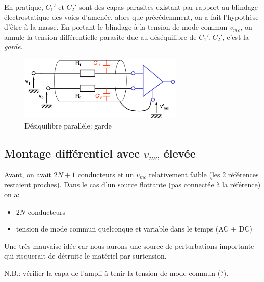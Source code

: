 En pratique, \(C_1'\text{ et }C_2'\) sont des capas parasites existant par rapport au blindage électrostatique des voies d'amenée, alors que précédemment, on a fait l'hypothèse d'être à la masse. En portant le blindage à la tension de mode commun \(v_{mc}\), on annule la tension différentielle parasite due au déséquilibre de \(C_1', C_2'\), c'est la \emph{garde}.
\begin{figure}[H] 
	\centering 
	\includegraphics[width=0.7\textwidth,height=10\baselineskip,keepaspectratio]{ch3/image20} 
	\caption{Désiquilibre parallèle: garde} 
\end{figure}
\subsection{Montage différentiel avec \texorpdfstring{\(v_{mc}\)}{tension de mode commun} élevée}\label{subsec:montdiffvmcgrand}
Avant, on avait \(2N+1\) conducteurs et un \(v_{mc}\) relativement faible (les 2 références restaient proches). Dans le cas d'un source flottante (pas connectée à la référence) on a:
\begin{itemize}
	\item \(2N\) conducteurs
	\item tension de mode commun quelconque et variable dans le temps (AC + DC)
\end{itemize}
Une très mauvaise idée car nous aurons une source de perturbations importante qui risquerait de détruite le matériel par surtension.

N.B.: vérifier la capa de l'ampli à tenir la tension de mode commun (\!?).
